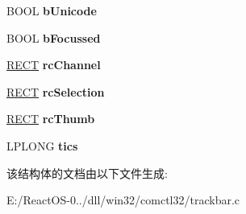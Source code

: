 \begin{DoxyCompactItemize}
B\+O\+OL {\bfseries b\+Unicode}
\item 
\mbox{\label{struct_t_r_a_c_k_b_a_r___i_n_f_o_a6a31f85de9b8cb6fdad32232aaef9d78}} 
B\+O\+OL {\bfseries b\+Focussed}
\item 
\mbox{\label{struct_t_r_a_c_k_b_a_r___i_n_f_o_a4a981c801834ddd7d33bbb8ec670c10a}} 
\hyperlink{structtag_r_e_c_t}{R\+E\+CT} {\bfseries rc\+Channel}
\item 
\mbox{\label{struct_t_r_a_c_k_b_a_r___i_n_f_o_a7dd4a3d4b49cb44195a82e3def95f6f1}} 
\hyperlink{structtag_r_e_c_t}{R\+E\+CT} {\bfseries rc\+Selection}
\item 
\mbox{\label{struct_t_r_a_c_k_b_a_r___i_n_f_o_a0e76ffce4837a9f57701b5fa3386aa84}} 
\hyperlink{structtag_r_e_c_t}{R\+E\+CT} {\bfseries rc\+Thumb}
\item 
\mbox{\label{struct_t_r_a_c_k_b_a_r___i_n_f_o_a29f53e3120be769c8a2930ef7251d929}} 
L\+P\+L\+O\+NG {\bfseries tics}
\end{DoxyCompactItemize}


该结构体的文档由以下文件生成\+:\begin{DoxyCompactItemize}
\item 
E\+:/\+React\+O\+S-\/0../dll/win32/comctl32/trackbar.\+c\end{DoxyCompactItemize}
